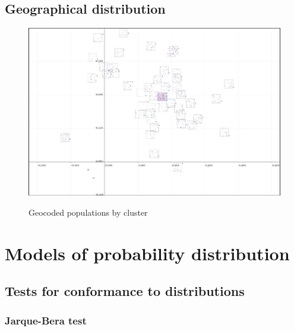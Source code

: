 \documentclass[10pt]{article}
\begin{document}
\subsection{Geographical distribution}
\begin{figure}
\caption{Geocoded populations by cluster}
\label{GeographicalDistributionOfPopulation}
\begin{center}
\includegraphics[width=170mm]{ReportMedia/GeographicalDistributionOfPopulation.jpg}\\
\end{center}
\end{figure}
\newpage
\section{Models of probability distribution}
\newpage
\subsection{Tests for conformance to distributions}
\newpage
\subsubsection{Jarque-Bera test}
\end{document}

